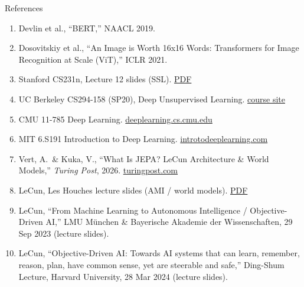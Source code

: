 \begin{frame}[allowframebreaks]{References}
\begin{enumerate}
    \item Devlin et al., ``BERT,'' NAACL 2019.
    \item Dosovitskiy et al., ``An Image is Worth 16x16 Words: Transformers for Image Recognition at Scale (ViT),'' ICLR 2021.
    \item Stanford CS231n, Lecture 12 slides (SSL). \href{https://cs231n.stanford.edu/2024/slides/2024/lecture_12.pdf}{PDF}
    \item UC Berkeley CS294-158 (SP20), Deep Unsupervised Learning. \href{https://sites.google.com/view/berkeley-cs294-158-sp20/home}{course site}
    \item CMU 11-785 Deep Learning. \href{https://deeplearning.cs.cmu.edu/}{deeplearning.cs.cmu.edu}
    \item MIT 6.S191 Introduction to Deep Learning. \href{https://introtodeeplearning.com/}{introtodeeplearning.com}
    \item Vert, A.\ \& Kuka, V., ``What Is JEPA? LeCun Architecture \& World Models,'' \emph{Turing Post}, 2026. \href{https://www.turingpost.com/p/jepa}{turingpost.com}
    \item LeCun, Les Houches lecture slides (AMI / world models). \href{https://leshouches2022.github.io/SLIDES/lecun-20220720-leshouches-03.pdf}{PDF}
    \item LeCun, ``From Machine Learning to Autonomous Intelligence / Objective-Driven AI,'' LMU M\"unchen \& Bayerische Akademie der Wissenschaften, 29 Sep 2023 (lecture slides).
    \item LeCun, ``Objective-Driven AI: Towards AI systems that can learn, remember, reason, plan, have common sense, yet are steerable and safe,'' Ding-Shum Lecture, Harvard University, 28 Mar 2024 (lecture slides).
  \end{enumerate}
\end{frame}
